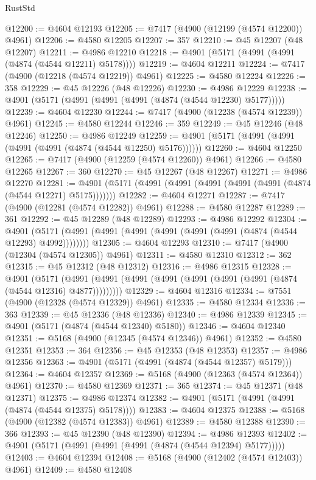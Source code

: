 \begin{lexlean}{RustStd}
\begin{coremodule}
@12200 := @4604 @12193
@12205 := @7417 (@4900 (@12199 (@4574 @12200)) @4961)
@12206 := @4580 @12205
@12207 := 357
@12210 := @45 @12207 (@48 @12207)
@12211 := @4986 @12210
@12218 := @4901 (@5171 (@4991 (@4991 (@4874 (@4544 @12211) @5178))))
@12219 := @4604 @12211
@12224 := @7417 (@4900 (@12218 (@4574 @12219)) @4961)
@12225 := @4580 @12224
@12226 := 358
@12229 := @45 @12226 (@48 @12226)
@12230 := @4986 @12229
@12238 := @4901 (@5171 (@4991 (@4991 (@4991 (@4874 (@4544 @12230) @5177)))))
@12239 := @4604 @12230
@12244 := @7417 (@4900 (@12238 (@4574 @12239)) @4961)
@12245 := @4580 @12244
@12246 := 359
@12249 := @45 @12246 (@48 @12246)
@12250 := @4986 @12249
@12259 := @4901 (@5171 (@4991 (@4991 (@4991 (@4991 (@4874 (@4544 @12250) @5176))))))
@12260 := @4604 @12250
@12265 := @7417 (@4900 (@12259 (@4574 @12260)) @4961)
@12266 := @4580 @12265
@12267 := 360
@12270 := @45 @12267 (@48 @12267)
@12271 := @4986 @12270
@12281 := @4901 (@5171 (@4991 (@4991 (@4991 (@4991 (@4991 (@4874 (@4544 @12271) @5175)))))))
@12282 := @4604 @12271
@12287 := @7417 (@4900 (@12281 (@4574 @12282)) @4961)
@12288 := @4580 @12287
@12289 := 361
@12292 := @45 @12289 (@48 @12289)
@12293 := @4986 @12292
@12304 := @4901 (@5171 (@4991 (@4991 (@4991 (@4991 (@4991 (@4991 (@4874 (@4544 @12293) @4992))))))))
@12305 := @4604 @12293
@12310 := @7417 (@4900 (@12304 (@4574 @12305)) @4961)
@12311 := @4580 @12310
@12312 := 362
@12315 := @45 @12312 (@48 @12312)
@12316 := @4986 @12315
@12328 := @4901
    (@5171 (@4991 (@4991 (@4991 (@4991 (@4991 (@4991 (@4991 (@4874 (@4544 @12316) @4877)))))))))
@12329 := @4604 @12316
@12334 := @7551 (@4900 (@12328 (@4574 @12329)) @4961)
@12335 := @4580 @12334
@12336 := 363
@12339 := @45 @12336 (@48 @12336)
@12340 := @4986 @12339
@12345 := @4901 (@5171 (@4874 (@4544 @12340) @5180))
@12346 := @4604 @12340
@12351 := @5168 (@4900 (@12345 (@4574 @12346)) @4961)
@12352 := @4580 @12351
@12353 := 364
@12356 := @45 @12353 (@48 @12353)
@12357 := @4986 @12356
@12363 := @4901 (@5171 (@4991 (@4874 (@4544 @12357) @5179)))
@12364 := @4604 @12357
@12369 := @5168 (@4900 (@12363 (@4574 @12364)) @4961)
@12370 := @4580 @12369
@12371 := 365
@12374 := @45 @12371 (@48 @12371)
@12375 := @4986 @12374
@12382 := @4901 (@5171 (@4991 (@4991 (@4874 (@4544 @12375) @5178))))
@12383 := @4604 @12375
@12388 := @5168 (@4900 (@12382 (@4574 @12383)) @4961)
@12389 := @4580 @12388
@12390 := 366
@12393 := @45 @12390 (@48 @12390)
@12394 := @4986 @12393
@12402 := @4901 (@5171 (@4991 (@4991 (@4991 (@4874 (@4544 @12394) @5177)))))
@12403 := @4604 @12394
@12408 := @5168 (@4900 (@12402 (@4574 @12403)) @4961)
@12409 := @4580 @12408

\end{coremodule}
\end{lexlean}
